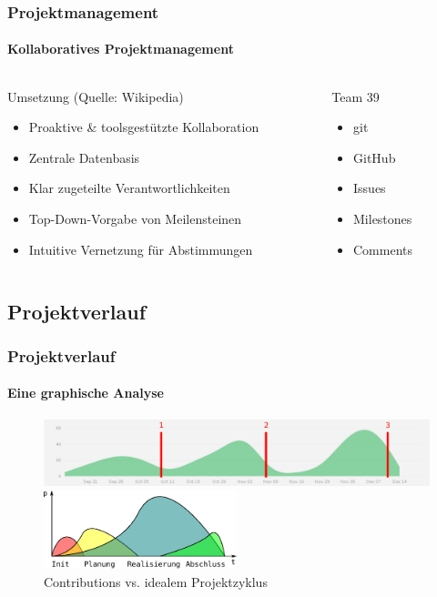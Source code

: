 \begin{frame}
	\frametitle{Projektmanagement \hfill \footnotesize \group}
	\framesubtitle{Kollaboratives Projektmanagement}
	\begin{columns}
		\begin{column}{0.7\textwidth}
			\begin{block}{Umsetzung (Quelle: Wikipedia)}
				\begin{itemize}
					\item Proaktive \& toolsgestützte Kollaboration
					\item Zentrale Datenbasis
					\item Klar zugeteilte Verantwortlichkeiten
					\item Top-Down-Vorgabe von Meilensteinen
					\item Intuitive Vernetzung für Abstimmungen
				\end{itemize}
			\end{block}
		\end{column}
		\pause
		\begin{column}{0.3\textwidth}
			\begin{exampleblock}{Team 39}
				\begin{itemize}
					\item git
					\item GitHub
					\item Issues
					\item Milestones
					\item Comments
				\end{itemize}
			\end{exampleblock}
		\end{column}
	\end{columns}
\end{frame}

\subsection{Projektverlauf}
\begin{frame}
	\frametitle{Projektverlauf\hfill{}\footnotesize \group}
	\framesubtitle{Eine graphische Analyse}
	\begin{figure}
		\centering
		\includegraphics[width=1\textwidth]{../../fig/pm/gh-contributions-ov_marked.pdf}

		\includegraphics[width=0.5\textwidth]{../../fig/pm/pm-phasen.pdf}
		\caption{Contributions vs. idealem Projektzyklus}
	\end{figure}
\end{frame}

